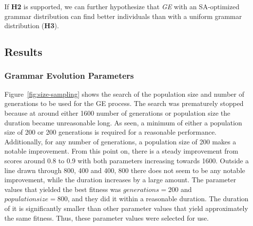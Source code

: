 If \textbf{H2} is supported, we can further hypothesize that \textit{GE} with an SA-optimized grammar distribution can find better individuals than with a uniform grammar distribution (\textbf{H3}).


\subsection{Results}
\subsubsection{Grammar Evolution Parameters}
Figure~\ref{fig:size-sampling} shows the search of the population size and number of generations to be used for the GE process.
The search was prematurely stopped because at around either 1600 number of generations or population size the duration became unreasonable long.
As seen, a minimum of either a population size of 200 or 200 generations is required for a reasonable performance.
Additionally, for any number of generations, a population size of 200 makes a notable improvement.
From this point on, there is a steady improvement from scores around 0.8 to 0.9 with both parameters increasing towards 1600.
Outside a line drawn through 800, 400 and 400, 800 there does not seem to be any notable improvement, while the duration increases by a large amount.
The parameter values that yielded the best fitness was $generations = 200$ and $population size = 800$, and they did it within a reasonable duration.
The duration of it is significantly smaller than other parameter values that yield approximately the same fitness.
Thus, these parameter values were selected for use.

